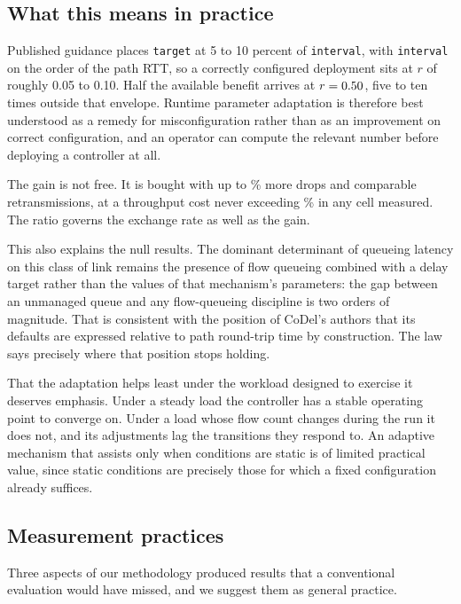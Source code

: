 \subsection*{What this means in practice}

Published guidance places \texttt{target} at 5 to 10 percent of
\texttt{interval}, with \texttt{interval} on the order of the path RTT, so a
correctly configured deployment sits at $r$ of roughly 0.05 to 0.10. Half the
available benefit arrives at $r = 0.50$, five to ten times outside
that envelope. Runtime parameter adaptation is therefore best understood as a
remedy for misconfiguration rather than as an improvement on correct
configuration, and an operator can compute the relevant number before
deploying a controller at all.

The gain is not free. It is bought with up to \LawDropRiseHigh\% more drops
and comparable retransmissions, at a throughput cost never exceeding
\LawWorstThroughput\% in any cell measured. The ratio governs the exchange
rate as well as the gain.

This also explains the null results. The dominant determinant of queueing
latency on this class of link remains the presence of flow queueing combined
with a delay target rather than the values of that mechanism's parameters: the
gap between an unmanaged queue and any flow-queueing discipline is two orders
of magnitude. That is consistent with the position of CoDel's
authors\cite{nichols2012} that its defaults are expressed relative to path
round-trip time by construction. The law says precisely where that position
stops holding.

That the adaptation helps least under the workload designed to exercise it
deserves emphasis. Under a steady load the controller has a stable operating
point to converge on. Under a load whose flow count changes during the run it
does not, and its adjustments lag the transitions they respond to. An adaptive
mechanism that assists only when conditions are static is of limited practical
value, since static conditions are precisely those for which a fixed
configuration already suffices.

\subsection*{Measurement practices}

Three aspects of our methodology produced results that a conventional
evaluation would have missed, and we suggest them as general practice.

